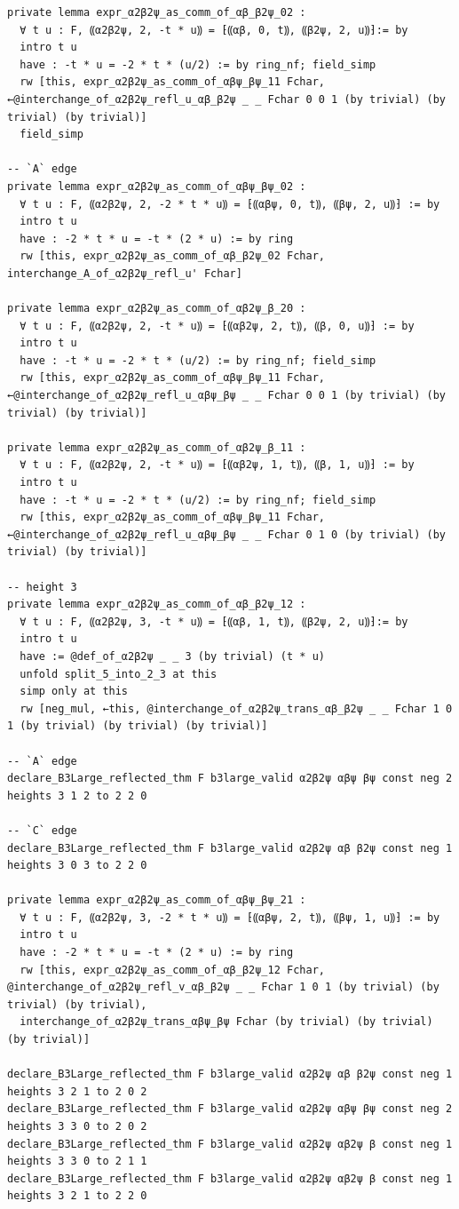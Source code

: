 \documentclass[10pt,a4paper]{article}
\begin{document}
\begin{Verbatim}
private lemma expr_α2β2ψ_as_comm_of_αβ_β2ψ_02 :
  ∀ t u : F, ⸨α2β2ψ, 2, -t * u⸩ = ⁅⸨αβ, 0, t⸩, ⸨β2ψ, 2, u⸩⁆:= by
  intro t u
  have : -t * u = -2 * t * (u/2) := by ring_nf; field_simp
  rw [this, expr_α2β2ψ_as_comm_of_αβψ_βψ_11 Fchar, ←@interchange_of_α2β2ψ_refl_u_αβ_β2ψ _ _ Fchar 0 0 1 (by trivial) (by trivial) (by trivial)]
  field_simp

-- `A` edge
private lemma expr_α2β2ψ_as_comm_of_αβψ_βψ_02 :
  ∀ t u : F, ⸨α2β2ψ, 2, -2 * t * u⸩ = ⁅⸨αβψ, 0, t⸩, ⸨βψ, 2, u⸩⁆ := by
  intro t u
  have : -2 * t * u = -t * (2 * u) := by ring
  rw [this, expr_α2β2ψ_as_comm_of_αβ_β2ψ_02 Fchar, interchange_A_of_α2β2ψ_refl_u' Fchar]

private lemma expr_α2β2ψ_as_comm_of_αβ2ψ_β_20 :
  ∀ t u : F, ⸨α2β2ψ, 2, -t * u⸩ = ⁅⸨αβ2ψ, 2, t⸩, ⸨β, 0, u⸩⁆ := by
  intro t u
  have : -t * u = -2 * t * (u/2) := by ring_nf; field_simp
  rw [this, expr_α2β2ψ_as_comm_of_αβψ_βψ_11 Fchar, ←@interchange_of_α2β2ψ_refl_u_αβψ_βψ _ _ Fchar 0 0 1 (by trivial) (by trivial) (by trivial)]

private lemma expr_α2β2ψ_as_comm_of_αβ2ψ_β_11 :
  ∀ t u : F, ⸨α2β2ψ, 2, -t * u⸩ = ⁅⸨αβ2ψ, 1, t⸩, ⸨β, 1, u⸩⁆ := by
  intro t u
  have : -t * u = -2 * t * (u/2) := by ring_nf; field_simp
  rw [this, expr_α2β2ψ_as_comm_of_αβψ_βψ_11 Fchar, ←@interchange_of_α2β2ψ_refl_u_αβψ_βψ _ _ Fchar 0 1 0 (by trivial) (by trivial) (by trivial)]

-- height 3
private lemma expr_α2β2ψ_as_comm_of_αβ_β2ψ_12 :
  ∀ t u : F, ⸨α2β2ψ, 3, -t * u⸩ = ⁅⸨αβ, 1, t⸩, ⸨β2ψ, 2, u⸩⁆:= by
  intro t u
  have := @def_of_α2β2ψ _ _ 3 (by trivial) (t * u)
  unfold split_5_into_2_3 at this
  simp only at this
  rw [neg_mul, ←this, @interchange_of_α2β2ψ_trans_αβ_β2ψ _ _ Fchar 1 0 1 (by trivial) (by trivial) (by trivial)]

-- `A` edge
declare_B3Large_reflected_thm F b3large_valid α2β2ψ αβψ βψ const neg 2 heights 3 1 2 to 2 2 0

-- `C` edge
declare_B3Large_reflected_thm F b3large_valid α2β2ψ αβ β2ψ const neg 1 heights 3 0 3 to 2 2 0

private lemma expr_α2β2ψ_as_comm_of_αβψ_βψ_21 :
  ∀ t u : F, ⸨α2β2ψ, 3, -2 * t * u⸩ = ⁅⸨αβψ, 2, t⸩, ⸨βψ, 1, u⸩⁆ := by
  intro t u
  have : -2 * t * u = -t * (2 * u) := by ring
  rw [this, expr_α2β2ψ_as_comm_of_αβ_β2ψ_12 Fchar, @interchange_of_α2β2ψ_refl_v_αβ_β2ψ _ _ Fchar 1 0 1 (by trivial) (by trivial) (by trivial),
  interchange_of_α2β2ψ_trans_αβψ_βψ Fchar (by trivial) (by trivial) (by trivial)]

declare_B3Large_reflected_thm F b3large_valid α2β2ψ αβ β2ψ const neg 1 heights 3 2 1 to 2 0 2
declare_B3Large_reflected_thm F b3large_valid α2β2ψ αβψ βψ const neg 2 heights 3 3 0 to 2 0 2
declare_B3Large_reflected_thm F b3large_valid α2β2ψ αβ2ψ β const neg 1 heights 3 3 0 to 2 1 1
declare_B3Large_reflected_thm F b3large_valid α2β2ψ αβ2ψ β const neg 1 heights 3 2 1 to 2 2 0


\end{Verbatim}
\end{document}
